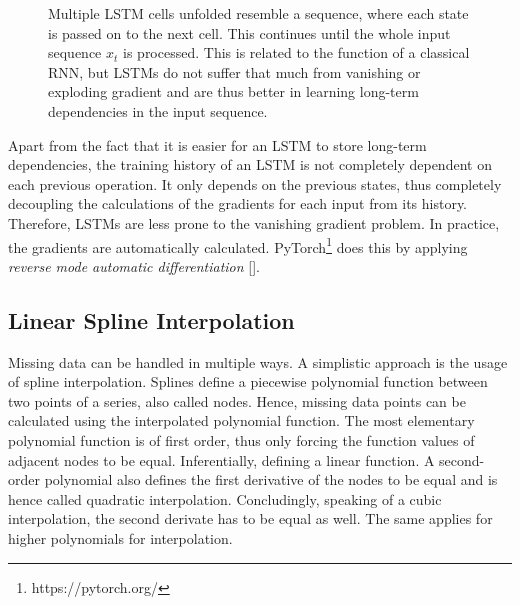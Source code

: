 \documentclass[11pt]{scrartcl}
\begin{document}
\begin{figure}[hbt]
	\caption{Multiple LSTM cells unfolded resemble a sequence, where each state is passed on to the next cell. This continues until the whole input sequence $x_t$ is processed. This is related to the function of a classical RNN, but LSTMs do not suffer that much from vanishing or exploding gradient and are thus better in learning long-term dependencies in the input sequence.}
	\label{fig:lstm-sequence}
\end{figure}

Apart from the fact that it is easier for an LSTM to store long-term dependencies, the training history of an LSTM is not completely dependent on each previous operation. It only depends on the previous states, thus completely decoupling the calculations of the gradients for each input from its history. Therefore, LSTMs are less prone to the vanishing gradient problem. In practice, the gradients are automatically calculated. PyTorch\footnote{https://pytorch.org/} does this by applying \textit{reverse mode automatic differentiation} [\cite{paszke2019pytorch}].

\FloatBarrier
\subsection{Linear Spline Interpolation}

Missing data can be handled in multiple ways. A simplistic approach is the usage of spline interpolation. Splines define a piecewise polynomial function between two points of a series, also called nodes. Hence, missing data points can be calculated using the interpolated polynomial function. The most elementary polynomial function is of first order, thus only forcing the function values of adjacent nodes to be equal. Inferentially, defining a linear function. A second-order polynomial also defines the first derivative of the nodes to be equal and is hence called quadratic interpolation. Concludingly, speaking of a cubic interpolation, the second derivate has to be equal as well. The same applies for higher polynomials for interpolation.
\end{document}
